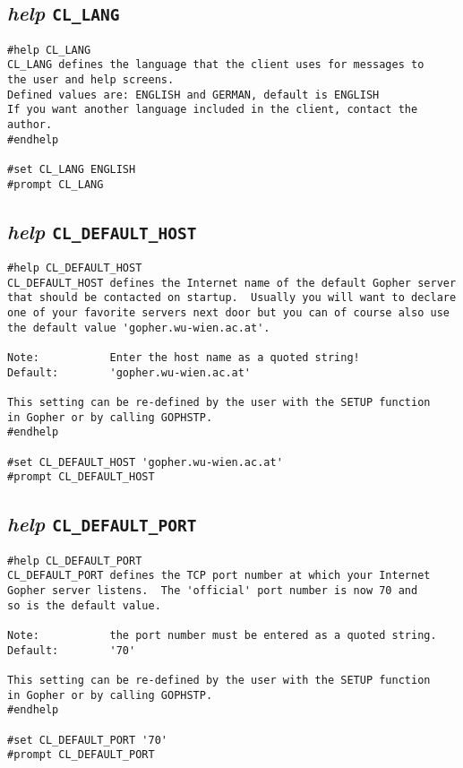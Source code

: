 \subsection{{\sl{help}} {\tt CL\_LANG}}

\def\LPtopD{{\sl{help}} {\tt CL\_LANG}}

\def\LPtopF{~}

\begin{verbatim}
#help CL_LANG
CL_LANG defines the language that the client uses for messages to
the user and help screens.
Defined values are: ENGLISH and GERMAN, default is ENGLISH
If you want another language included in the client, contact the author.
#endhelp

#set CL_LANG ENGLISH
#prompt CL_LANG
\end{verbatim}

\subsection{{\sl{help}} {\tt CL\_DEFAULT\_HOST}}

\def\LPtopD{{\sl{help}} {\tt CL\_DEFAULT\_HOST}}

\def\LPtopF{~}

\begin{verbatim}
#help CL_DEFAULT_HOST
CL_DEFAULT_HOST defines the Internet name of the default Gopher server
that should be contacted on startup.  Usually you will want to declare
one of your favorite servers next door but you can of course also use
the default value 'gopher.wu-wien.ac.at'.

Note:           Enter the host name as a quoted string!
Default:        'gopher.wu-wien.ac.at'

This setting can be re-defined by the user with the SETUP function
in Gopher or by calling GOPHSTP.
#endhelp

#set CL_DEFAULT_HOST 'gopher.wu-wien.ac.at'
#prompt CL_DEFAULT_HOST
\end{verbatim}

\subsection{{\sl{help}} {\tt CL\_DEFAULT\_PORT}}

\def\LPtopD{{\sl{help}} {\tt CL\_DEFAULT\_PORT}}

\def\LPtopF{~}

\begin{verbatim}
#help CL_DEFAULT_PORT
CL_DEFAULT_PORT defines the TCP port number at which your Internet 
Gopher server listens.  The 'official' port number is now 70 and
so is the default value.

Note:           the port number must be entered as a quoted string.
Default:        '70'

This setting can be re-defined by the user with the SETUP function
in Gopher or by calling GOPHSTP.
#endhelp

#set CL_DEFAULT_PORT '70'
#prompt CL_DEFAULT_PORT
\end{verbatim}

